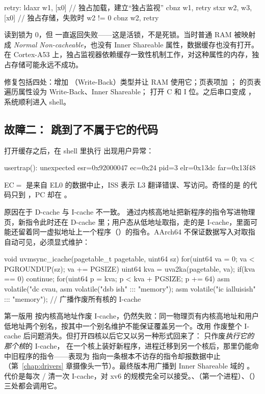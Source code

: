 \begin{asmcode}
retry:  ldaxr w1, [x0]      // 独占加载，建立“独占监视”
        cbnz  w1, retry
        stxr  w2, w3, [x0]  // 独占存储，失败时 w2 != 0
        cbnz  w2, retry
\end{asmcode}

 读到锁为 0，但  一直返回失败——这是活锁，不是死锁。当时普通 RAM 被映射成 \emph{Normal Non-cacheable}，也没有 Inner Shareable 属性，数据缓存也没有打开。在 Cortex-A53 上，独占监视器依赖缓存一致性机制工作，对这种属性的内存，独占存储可能永远不成功。

修复包括四处：增加 （Write-Back）类型并让 RAM 使用它；页表项加 ； 的页表遍历属性设为 Write-Back、Inner Shareable； 打开 C 和 I 位。之后串口变成 ，系统顺利进入 shell。

\subsection{故障二： 跳到了不属于它的代码}

打开缓存之后，在 shell 里执行  出现用户异常：

\begin{txtcode}
usertrap(): unexpected esr=0x92000047 ec=0x24 pid=3
            elr=0x13dc far=0x13f48
\end{txtcode}

EC$=$ 是来自 EL0 的数据中止，ISS 表示 L3 翻译错误、写访问。奇怪的是  的代码只到 ，PC 却在 。

原因在于 D-cache 与 I-cache 不一致。 通过内核高地址把新程序的指令写进物理页，新指令此时还在 D-cache 里；用户态从低地址取指，走的是 I-cache，里面可能还留着同一虚拟地址上一个程序（）的指令。AArch64 不保证数据写入对取指自动可见，必须显式维护：

\begin{ccode}
void uvmsync_icache(pagetable_t pagetable, uint64 sz) {
  for(uint64 va = 0; va < PGROUNDUP(sz); va += PGSIZE){
    uint64 kva = uva2ka(pagetable, va);
    if(kva == 0) continue;
    for(uint64 p = kva; p < kva + PGSIZE; p += 64)
      asm volatile("dc cvau, %
  }
  asm volatile("dsb ish" ::: "memory");
  asm volatile("ic ialluis\n\tdsb ish\n\tisb" ::: "memory"); // 广播作废所有核的 I-cache
}
\end{ccode}

第一版用  按内核高地址作废 I-cache，仍然失败：同一物理页有内核高地址和用户低地址两个别名，按其中一个别名维护不能保证覆盖另一个。改用  作废整个 I-cache 后问题消失。但打开四核以后它又以另一种形式回来了： 只作废\emph{执行它的那个核}的 I-cache， 在一个核上装好新程序，进程迁移到另一个核后，那里仍能命中旧程序的指令——表现为  指向一条根本不访存的指令却报数据中止（第~\ref{chap:drivers} 章摄像头一节）。最终版本用广播到 Inner Shareable 域的 。代价是每次 / 清一次 I-cache，对 xv6 的规模完全可以接受。、（第一个进程）、（）三处都会调用它。

